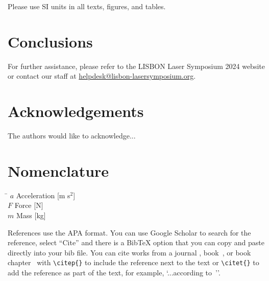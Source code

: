 \documentclass[fleqn]{LxSymp_2026_Paper_Format}
\begin{document}
Please use SI units in all texts, figures, and tables.

\section{Conclusions}
\label{Sec:Conclusions}

For further assistance, please refer to the LISBON Laser Symposium 2024 website or contact our staff at \href{mailto:helpdesk@lisbon-lasersymposium.org}{helpdesk@lisbon-lasersymposium.org}.

\section*{Acknowledgements}
The authors would like to acknowledge...

\section*{Nomenclature}
\begin{tabbing}
\hspace*{1.18 cm}  \= \hspace*{4 cm}  \kill
$a$ 	\>	Acceleration [m s$^2$]    \\
$F$		\> 	Force [N]	\\
$m$ 	\> 	Mass [kg]
\end{tabbing}

References use the APA format. You can use Google Scholar to search for the reference, select ``Cite'' and there is a BibTeX option that you can copy and paste directly into your bib file. You can cite works from a journal \citep{foucaut2004piv}, book~\citep{yarin2017collision}, or book chapter~\citep{armstrong1988laser} with \verb|\citep{}| to include the reference next to the text or \verb|\citet{}| to add the reference as part of the text, for example, `...according to~\citet{panao2018spray}''.





\end{document}
